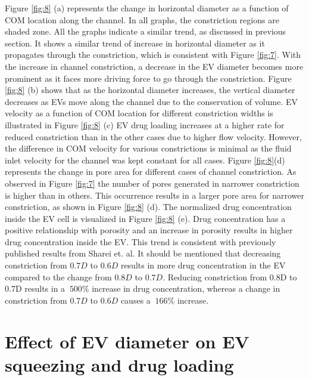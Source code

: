 Figure \ref{fig:8} (a) represents the change in horizontal diameter as a function of COM location along the channel. In all graphs, the constriction regions are shaded zone. All the graphs indicate a similar trend, as discussed in previous section. It shows a similar trend of increase in horizontal diameter as it propagates through the constriction, which is consistent with Figure \ref{fig:7}. With the increase in channel constriction, a decrease in the EV diameter becomes more prominent as it faces more driving force to go through the constriction. Figure \ref{fig:8} (b) shows that as the horizontal diameter increases, the vertical diameter decreases as EVs move along the channel due to the conservation of volume. EV velocity as a function of COM location for different constriction widths is illustrated in Figure \ref{fig:8} (c) EV drug loading increases at a higher rate for reduced constriction than in the other cases due to higher flow velocity. However, the difference in COM velocity for various constrictions is minimal as the fluid inlet velocity for the channel was kept constant for all cases. Figure \ref{fig:8}(d) represents the change in pore area for different cases of channel constriction. As observed in Figure \ref{fig:7} the number of pores generated in narrower constriction is higher than in others. This occurrence results in a larger pore area for narrower constriction, as shown in Figure \ref{fig:8} (d). The normalized drug concentration inside the EV cell is visualized in Figure \ref{fig:8} (e). Drug concentration has a positive relationship with porosity and an increase in porosity results in higher drug concentration inside the EV. This trend is consistent with previously published results from Sharei et. al.\cite{a64,a67} It should be mentioned that decreasing constriction from $0.7D$ to $0.6D$ results in more drug concentration in the EV compared to the change from $0.8D$ to $0.7D$. Reducing constriction from 0.8D to 0.7D results in a $~500\%$ increase in drug concentration, whereas a change in constriction from $0.7D$ to $0.6D$ causes a $~166\%$ increase.

\section{Effect of EV diameter on EV squeezing and drug loading}
 
